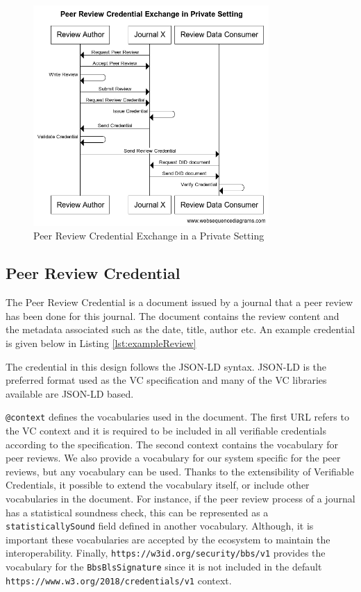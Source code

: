 \begin{figure}[htpb]
  \centering
  \includegraphics[width=0.8\textwidth]{figures/sequencePrivate.png}
  \caption{Peer Review Credential Exchange in a Private Setting} \label{fig:sequencePrivate}
\end{figure}

\subsection{Peer Review Credential}

The Peer Review Credential is a document issued by a journal that a peer review has been done for this journal. The document contains the review content and the metadata associated such as the date, title, author etc. An example credential is given below in Listing \ref{lst:exampleReview}



The credential in this design follows the JSON-LD syntax. JSON-LD is the preferred format used as the VC specification and many of the VC libraries available are JSON-LD based. 

\lstinline{@context} defines the vocabularies used in the document. The first URL refers to the VC context and it is required to be included in all verifiable credentials according to the specification. The second context contains the vocabulary for peer reviews. We also provide a vocabulary for our system specific for the peer reviews, but any vocabulary can be used. Thanks to the extensibility of Verifiable Credentials, it possible to extend the vocabulary itself, or include other vocabularies in the document. For instance, if the peer review process of a journal has a statistical soundness check, this can be represented as a \lstinline{statisticallySound} field defined in another vocabulary. Although, it is important these vocabularies are accepted by the ecosystem to maintain the interoperability. Finally, \lstinline{https://w3id.org/security/bbs/v1} provides the vocabulary for the \lstinline{BbsBlsSignature} since it is not included in the default \lstinline{https://www.w3.org/2018/credentials/v1} context.

